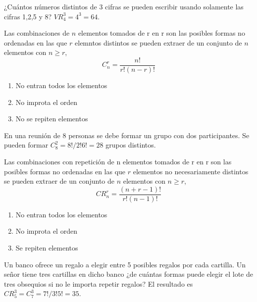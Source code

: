 \begin{ejm}
¿Cuántos números distintos de 3 cifras se pueden escribir usando solamente las cifras 1,2,5 y 8? $VR^{3}_4 = 4^3 = 64$.
\end{ejm}

\begin{defn}[Combinaciones]
Las combinaciones de $n$ elementos tomados de r en r son las posibles formas no ordenadas en las que $r$ elemntos distintos se pueden extraer de un conjunto de $n$ elementos con $n \geq r$, \[C^{r}_n = \frac{n!}{r!(n-r)!}\]
\begin{enumerate}[label=(\roman*)]
    \item No entran todos los elementos
    \item No improta el orden
    \item No se repiten elementos
\end{enumerate}
\end{defn}

\begin{ejr}

\end{ejr}

\begin{ejr}

\end{ejr}

\begin{ejm}
En una reunión de 8 personas se debe formar un grupo con dos participantes. Se pueden formar $C^{2}_8 = 8!/2!6! = 28$ grupos distintos.
\end{ejm}

\begin{defn}
Las combinaciones con repetición de n elementos tomados de r en r son las posibles formas no ordenadas en las que $r$ elementos no necesariamente distintos se pueden extraer de un conjunto de $n$ elementos con $n \geq r$, \[ CR^{r}_n = \frac{(n + r - 1)!}{r!(n-1)!} \]
\begin{enumerate}[label=(\roman*)]
    \item No entran todos los elementos
    \item No improta el orden
    \item Se repiten elementos
\end{enumerate}
\end{defn}

\begin{ejm}
Un banco ofrece un regalo a elegir entre 5 posibles regalos por cada cartilla. Un señor tiene tres cartillas en dicho banco ¿de cuántas formas puede elegir el lote de tres obsequios si no le importa repetir regalos? El resultado es $CR^{3}_5 = C^{3}_7 = 7!/3!5! = 35$.
\end{ejm}

